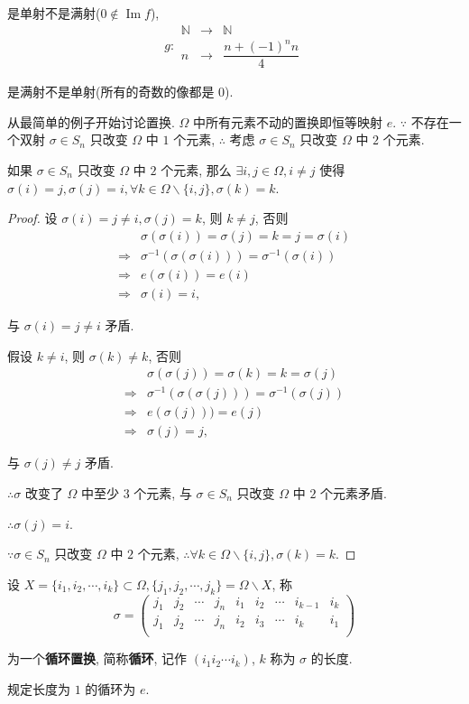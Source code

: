 \documentclass{ctexart}
\begin{document}
是单射不是满射($0\notin\operatorname{Im}f$),
\[g:\begin{array}{rcl}
\mathbb{N} & \to & \mathbb{N} \\
n & \to & \dfrac{n+(-1)^nn}{4}
\end{array}\]

是满射不是单射(所有的奇数的像都是 $0$).

从最简单的例子开始讨论置换. $\Omega$ 中所有元素不动的置换即恒等映射 $e$. $\because$ 不存在一个双射 $\sigma\in S_n$ 只改变 $\Omega$ 中 $1$ 个元素, $\therefore$ 考虑 $\sigma\in S_n$ 只改变 $\Omega$ 中 $2$ 个元素.
\begin{lemma}
    如果 $\sigma\in S_n$ 只改变 $\Omega$ 中 $2$ 个元素, 那么 $\exists i,j\in\Omega,i\neq j$ 使得 $\sigma(i)=j,\sigma(j)=i,\forall k\in\Omega\backslash\{i,j\},\sigma(k)=k$.
\end{lemma}
\begin{proof}
    设 $\sigma(i)=j\neq i,\sigma(j)=k$, 则 $k\neq j$, 否则
    \begin{align*}
        & \sigma(\sigma(i))=\sigma(j)=k=j=\sigma(i) \\
        \Rightarrow & \sigma^{-1}(\sigma(\sigma(i)))=\sigma^{-1}(\sigma(i)) \\
        \Rightarrow & e(\sigma(i))=e(i) \\
        \Rightarrow & \sigma(i)=i,
    \end{align*}

    与 $\sigma(i)=j\neq i$ 矛盾.

    假设 $k\neq i$, 则 $\sigma(k)\neq k$, 否则
    \begin{align*}
        & \sigma(\sigma(j))=\sigma(k)=k=\sigma(j) \\
        \Rightarrow & \sigma^{-1}(\sigma(\sigma(j)))=\sigma^{-1}(\sigma(j)) \\
        \Rightarrow & e(\sigma(j)))=e(j) \\
        \Rightarrow & \sigma(j)=j,
    \end{align*}

    与 $\sigma(j)\neq j$ 矛盾.

    $\therefore\sigma$ 改变了 $\Omega$ 中至少 $3$ 个元素, 与 $\sigma\in S_n$ 只改变 $\Omega$ 中 $2$ 个元素矛盾.

    $\therefore\sigma(j)=i$.

    $\because\sigma\in S_n$ 只改变 $\Omega$ 中 $2$ 个元素, $\therefore\forall k\in\Omega\backslash\{i,j\},\sigma(k)=k.$
\end{proof}
\begin{definition}
    设 $X=\{i_1,i_2,\cdots,i_k\}\subset\Omega,\{j_1,j_2,\cdots,j_k\}=\Omega\backslash X$, 称
    \[\sigma=\begin{pmatrix}
        j_1 & j_2 & \cdots & j_n & i_1 & i_2 & \cdots & i_{k-1} & i_k \\
        j_1 & j_2 & \cdots & j_n & i_2 & i_3 & \cdots & i_k & i_1 \\
    \end{pmatrix}\]

    为一个\textbf{循环置换}, 简称\textbf{循环}, 记作 $(i_1i_2\cdots i_k)$, $k$ 称为 $\sigma$ 的长度.

    规定长度为 $1$ 的循环为 $e$.
\end{definition}
\end{document}

